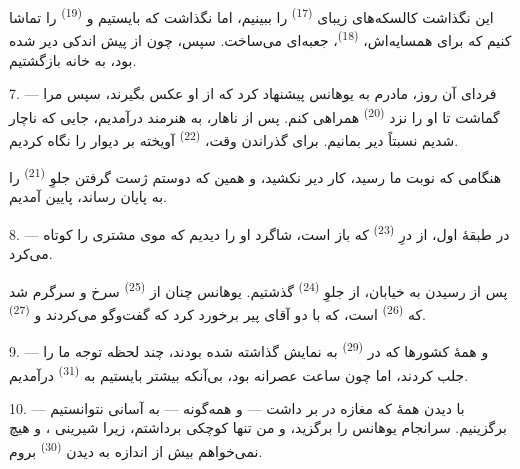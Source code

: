 این نگذاشت کالسکه‌های زیبای 
\textsuperscript{(17)} را ببینیم، اما نگذاشت که بایستیم و
 \textsuperscript{(19)} را تماشا کنیم که برای
همسایه‌اش،  \textsuperscript{(18)}،
جعبه‌ای می‌ساخت. سپس، چون از پیش اندکی دیر شده بود، به خانه بازگشتیم.

\VUsaut{3.0mm}

7. --- فردای آن روز، مادرم به یوهانس پیشنهاد کرد که از او عکس بگیرند،
سپس مرا گماشت تا او را نزد  \textsuperscript{(20)}
همراهی کنم. پس از ناهار، به  هنرمند درآمدیم، جایی که
ناچار شدیم نسبتاً دیر بمانیم. برای گذراندن وقت، 
\textsuperscript{(22)} آویخته بر دیوار را نگاه کردیم.

هنگامی که نوبت ما رسید، کار دیر نکشید، و همین که دوستم ژست گرفتن جلوِ
 \textsuperscript{(21)} را به پایان رساند، پایین
آمدیم.

8. --- در طبقهٔ اول، از درِ  \textsuperscript{(23)} که
باز است، شاگرد او را دیدیم که موی مشتری را کوتاه می‌کرد.

پس از رسیدن به خیابان، از جلوِ 
\textsuperscript{(24)} گذشتیم. یوهانس چنان از 
\textsuperscript{(25)} سرخ و  سرگرم شد که
 \textsuperscript{(26)} است، که با دو آقای پیر برخورد کرد
که گفت‌وگو می‌کردند و 
\textsuperscript{(27)}.

\VUsaut{3.0mm}

9. ---  و  همهٔ کشورها که در
  \textsuperscript{(29)} به نمایش گذاشته
شده بودند، چند لحظه توجه ما را جلب کردند، اما چون ساعت عصرانه بود،
بی‌آنکه بیشتر بایستیم به  \textsuperscript{(31)}
درآمدیم.

10. --- با دیدن همهٔ  که مغازه در بر داشت —
 و همه‌گونه  —
به آسانی نتوانستیم برگزینیم. سرانجام یوهانس  را
برگزید، و من تنها  کوچکی برداشتم، زیرا شیرینی
، و هیچ نمی‌خواهم بیش از اندازه به
دیدن  \textsuperscript{(30)} بروم.

\VUsaut{3.0mm}

